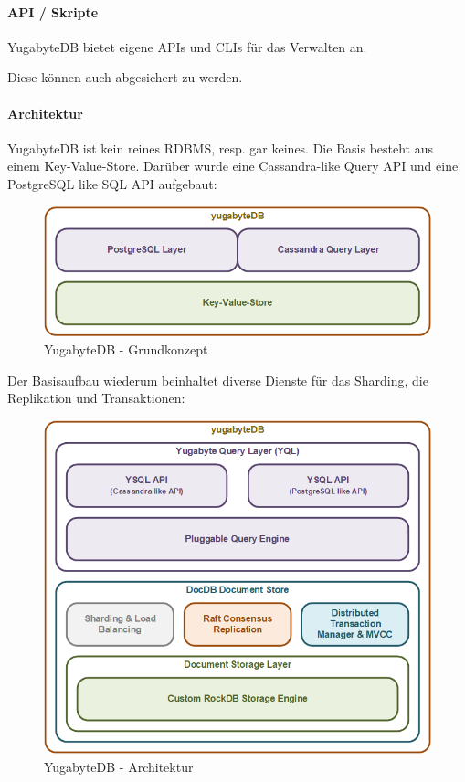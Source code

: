 \begin{flushleft}
    \paragraph{API / Skripte}
    YugabyteDB bietet eigene APIs \cite{ZXXLVVYW} und CLIs \cite{8846IPNK} für das Verwalten an.
\end{flushleft}
\begin{flushleft}
    Diese können auch abgesichert zu werden.
\end{flushleft}
\begin{flushleft}
    \paragraph{Architektur}
    YugabyteDB ist kein reines \Gls{RDBMS}, resp. gar keines.
    Die Basis besteht aus einem \Gls{Key-Value-Store}.
    Darüber wurde eine \Gls{Cassandra}-like Query API und eine \Gls{PostgreSQL} like SQL API aufgebaut:
    \begin{figure}[H]
        \centering
        \includegraphics[width=0.8\linewidth]{source/implementation/evaluation/postgresql_ha_solutions/yugabytedb/yugabytedb-concept}
        \caption{YugabyteDB - Grundkonzept}
        \label{fig:yugabytedb-concept}
    \end{figure}
\end{flushleft}
\begin{flushleft}
    Der Basisaufbau wiederum beinhaltet diverse Dienste für das Sharding, die Replikation und Transaktionen:
    \begin{figure}[H]
        \centering
        \includegraphics[width=0.8\linewidth]{source/implementation/evaluation/postgresql_ha_solutions/yugabytedb/yugabytedb-basic-archicture}
        \caption{YugabyteDB - Architektur}
        \label{fig:yugabytedb-basic-archicture}
    \end{figure}
\end{flushleft}
